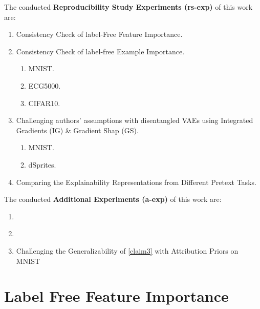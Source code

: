 The conducted \textbf{Reproducibility Study Experiments (rs-exp)} of this work are:
\begin{enumerate}[labelindent=\parindent,leftmargin=*, label=\textbf{rs-exp \arabic*},noitemsep,topsep=0pt]
    \itemsep0em
    \item\label{rsexp1} Consistency Check of label-Free Feature Importance.
    \item\label{rsexp2} Consistency Check of label-free Example Importance.
        \begin{enumerate}[labelindent=\parindent,leftmargin=*, label=\textbf{rs-exp2 \arabic*},noitemsep,topsep=0pt]
        \itemsep0em
        \item\label{rsexp21} MNIST.
        \item\label{rsexp22} ECG5000.
        \item\label{rsexp23} CIFAR10.
        \end{enumerate}
    \item\label{rsexp3} Challenging authors' assumptions with disentangled VAEs using Integrated Gradients (IG) \& Gradient Shap (GS).
    \begin{enumerate}[labelindent=\parindent,leftmargin=*, label=\textbf{rs-exp3 \arabic*},noitemsep,topsep=0pt]
    \itemsep0em
    \item\label{rsexp31} MNIST.
    \item\label{rsexp32} dSprites.
    \end{enumerate}
    \item\label{rsexp4} Comparing the Explainability Representations from Different Pretext Tasks. 
\end{enumerate}

\vspace{+2mm}

The conducted \textbf{Additional Experiments (a-exp)} of this work are:
\begin{enumerate}[labelindent=\parindent,leftmargin=*, label=\textbf{a-exp \arabic*},noitemsep,topsep=0pt]
    \itemsep0em
    \item\label{aexp1} 
    \item\label{aexp2} 
    \item\label{aexp3}  Challenging the Generalizability of \ref{claim3} with Attribution Priors on MNIST
\end{enumerate}

\section{Label Free Feature Importance}


